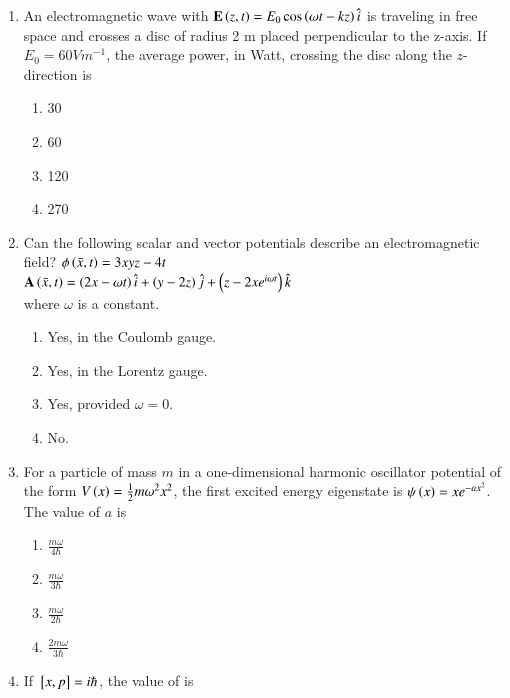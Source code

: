 \documentclass[journal]{IEEEtran}
\begin{document}
\begin{enumerate}[start=35]
	\item An electromagnetic wave with $\mathbf{E}\left(z,t\right)=E_0\cos\left(\omega t-kz\right)\hat{i}$ is traveling in free space and crosses a disc of radius 2 m placed perpendicular to the z-axis. If $E_0=60 V m^{-1}$, the average power, in Watt, crossing the disc along the $z$-direction is 
\begin{multicols}{4}
\begin{enumerate}
    \item 30
    \item 60
    \item 120
    \item 270
\end{enumerate}
\end{multicols}
\item Can the following scalar and vector potentials describe an electromagnetic field? 
$\phi\left(\bar{x},t\right)=3xyz-4t$ \\
$\mathbf{A}\left(\bar{x},t\right)=\left(2x-\omega t\right)\hat{i}+\left(y-2z\right)\hat{j}+\left(z-2xe^{i\omega t}\right)\hat{k}$
\\ where $\omega$ is a constant.
\begin{multicols}{2}
    \begin{enumerate}
        \item Yes, in the Coulomb gauge.
        \item Yes, in the Lorentz gauge.
        \item Yes, provided $\omega = 0$.
        \item No.
    \end{enumerate}
\end{multicols}
\item For a particle of mass $m$ in a one-dimensional harmonic oscillator potential of the form $V\left(x\right)=\frac{1}{2}m{\omega}^2x^2$, the first excited energy eigenstate is $\psi \left(x\right)=xe^{-ax^2}$. The value of $a$ is
\begin{multicols}{4}
    \begin{enumerate}
	    \item $\frac{m\omega}{4\hbar}$
	    \item $\frac{m\omega}{3\hbar}$
	    \item $\frac{m\omega}{2\hbar}$
	    \item $\frac{2m\omega}{3\hbar}$
    \end{enumerate}
\end{multicols}
\item If ${}\left[x,p\right]=i\hbar$, the value of  is

\end{enumerate}
\end{document}
